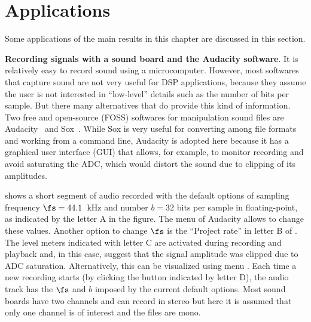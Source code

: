 
\section{Applications}
\label{sec:applications_signal}

Some applications of the main results in this chapter are discussed in this section.

\bApplication \textbf{Recording signals with a sound board and the Audacity software}.
\label{app:recording_sound}
It is relatively easy to record sound using a microcomputer. However, most softwares that capture sound are not very useful for DSP applications, because they assume the user is not interested in ``low-level'' details such as the number of bits per sample. But there many alternatives that do provide this kind of information. Two free and open-source (FOSS) softwares for manipulation sound files are Audacity~ and  Sox~. While Sox is very useful for converting among file formats and working from a command line, Audacity is adopted here because it has a graphical user interface (GUI) that allows, for example, to monitor recording and avoid saturating the ADC, which would distort the sound due to clipping of its amplitudes.

 shows a short segment of audio recorded with the default options of sampling frequency $\fs=44.1$~kHz and number $b=32$ bits per sample in floating-point, as indicated by the letter A in the figure. The menu  of Audacity allows to change these values. Another option to change $\fs$ is the ``Project rate'' in letter B of . The level meters indicated with letter C are activated during recording and playback and, in this case, suggest that the signal amplitude was clipped due to ADC saturation. Alternatively, this can be visualized using menu . Each time a new recording starts (by clicking the button indicated by letter D), the audio track has the $\fs$ and $b$ imposed by the current default options.
Most sound boards have two channels and can record in stereo but here it is assumed that only one channel is of interest and the files are mono.


